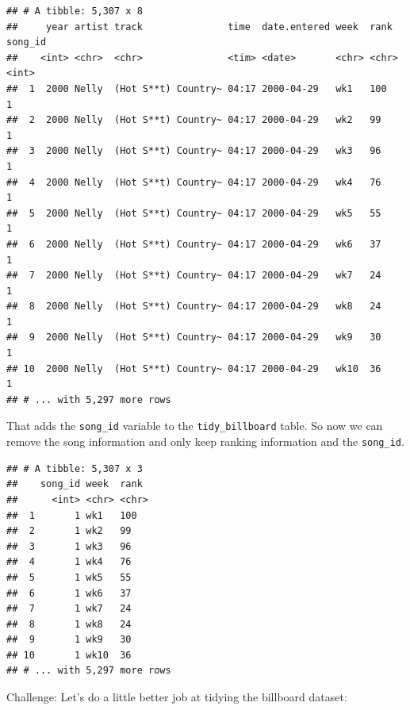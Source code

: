\documentclass[12pt,]{book}
\newenvironment{Shaded}{\begin{snugshade}}{\end{snugshade}}
\newcommand{\KeywordTok}[1]{\textcolor[rgb]{0.13,0.29,0.53}{\textbf{#1}}}
\newcommand{\StringTok}[1]{\textcolor[rgb]{0.31,0.60,0.02}{#1}}
\newcommand{\OperatorTok}[1]{\textcolor[rgb]{0.81,0.36,0.00}{\textbf{#1}}}
\newcommand{\NormalTok}[1]{#1}
\theoremstyle{definition}
\theoremstyle{definition}
\theoremstyle{definition}
\theoremstyle{remark}
\begin{document}
\begin{verbatim}
## # A tibble: 5,307 x 8
##     year artist track               time  date.entered week  rank  song_id
##    <int> <chr>  <chr>               <tim> <date>       <chr> <chr>   <int>
##  1  2000 Nelly  (Hot S**t) Country~ 04:17 2000-04-29   wk1   100         1
##  2  2000 Nelly  (Hot S**t) Country~ 04:17 2000-04-29   wk2   99          1
##  3  2000 Nelly  (Hot S**t) Country~ 04:17 2000-04-29   wk3   96          1
##  4  2000 Nelly  (Hot S**t) Country~ 04:17 2000-04-29   wk4   76          1
##  5  2000 Nelly  (Hot S**t) Country~ 04:17 2000-04-29   wk5   55          1
##  6  2000 Nelly  (Hot S**t) Country~ 04:17 2000-04-29   wk6   37          1
##  7  2000 Nelly  (Hot S**t) Country~ 04:17 2000-04-29   wk7   24          1
##  8  2000 Nelly  (Hot S**t) Country~ 04:17 2000-04-29   wk8   24          1
##  9  2000 Nelly  (Hot S**t) Country~ 04:17 2000-04-29   wk9   30          1
## 10  2000 Nelly  (Hot S**t) Country~ 04:17 2000-04-29   wk10  36          1
## # ... with 5,297 more rows
\end{verbatim}

That adds the \texttt{song\_id} variable to the \texttt{tidy\_billboard}
table. So now we can remove the song information and only keep ranking
information and the \texttt{song\_id}.

\begin{Shaded}
\end{Shaded}

\begin{verbatim}
## # A tibble: 5,307 x 3
##    song_id week  rank 
##      <int> <chr> <chr>
##  1       1 wk1   100  
##  2       1 wk2   99   
##  3       1 wk3   96   
##  4       1 wk4   76   
##  5       1 wk5   55   
##  6       1 wk6   37   
##  7       1 wk7   24   
##  8       1 wk8   24   
##  9       1 wk9   30   
## 10       1 wk10  36   
## # ... with 5,297 more rows
\end{verbatim}

Challenge: Let's do a little better job at tidying the billboard
dataset:
\end{document}
